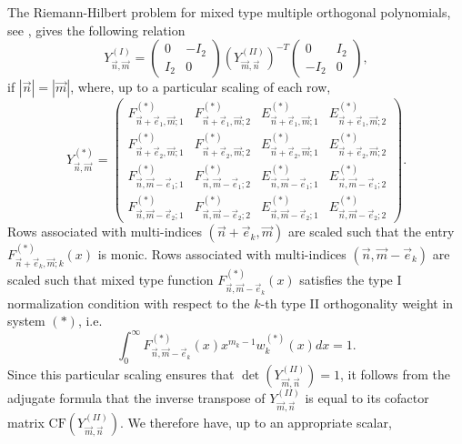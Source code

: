 \documentclass[a4paper,12pt,oneside]{article}
\theoremstyle{definition}
\begin{document}
The Riemann-Hilbert problem for mixed type multiple orthogonal polynomials, see \cite[Lemma 3.3]{DaemsKuijl}, gives the following relation
    $$Y_{\vec{n},\vec{m}}^{(I)} = \begin{pmatrix}
        0 & -I_2 \\
        I_2 & 0
    \end{pmatrix}
    (Y_{\vec{m},\vec{n}}^{(II)})^{-T}
    \begin{pmatrix}
        0 & I_2 \\
        -I_2 & 0
    \end{pmatrix},
    $$
if $|\vec{n}|=|\vec{m}|$, where, up to a particular scaling of each row,
    $$ Y_{\vec{n},\vec{m}}^{(\ast)} = \begin{pmatrix} 
    F_{\vec{n}+\vec{e}_1,\vec{m};1}^{(\ast)} & F_{\vec{n}+\vec{e}_1,\vec{m};2}^{(\ast)} & E_{\vec{n}+\vec{e}_1,\vec{m};1}^{(\ast)} & E_{\vec{n}+\vec{e}_1,\vec{m};2}^{(\ast)} \\ 
    F_{\vec{n}+\vec{e}_2,\vec{m};1}^{(\ast)} & F_{\vec{n}+\vec{e}_2,\vec{m};2}^{(\ast)} & E_{\vec{n}+\vec{e}_2,\vec{m};1}^{(\ast)} & E_{\vec{n}+\vec{e}_2,\vec{m};2}^{(\ast)} \\ 
    F_{\vec{n},\vec{m}-\vec{e}_1;1}^{(\ast)} & F_{\vec{n},\vec{m}-\vec{e}_1;2}^{(\ast)} & E_{\vec{n},\vec{m}-\vec{e}_1;1}^{(\ast)} & E_{\vec{n},\vec{m}-\vec{e}_1;2}^{(\ast)} \\ 
    F_{\vec{n},\vec{m}-\vec{e}_2;1}^{(\ast)} & F_{\vec{n},\vec{m}-\vec{e}_2;2}^{(\ast)} & E_{\vec{n},\vec{m}-\vec{e}_2;1}^{(\ast)} & E_{\vec{n},\vec{m}-\vec{e}_2;2}^{(\ast)} \end{pmatrix}. $$
Rows associated with multi-indices $(\vec{n}+\vec{e}_k,\vec{m})$ are scaled such that the entry $F_{\vec{n}+\vec{e}_k,\vec{m};k}^{(\ast)}(x)$ is monic. Rows associated with multi-indices $(\vec{n},\vec{m}-\vec{e}_k)$ are scaled such that mixed type function $F_{\vec{n},\vec{m}-\vec{e}_k}^{(\ast)}(x)$ satisfies the type I normalization condition with respect to the $k$-th type II orthogonality weight in system $(\ast)$, i.e.
$$ \int_0^\infty F_{\vec{n},\vec{m}-\vec{e}_k}^{(\ast)}(x) x^{m_k-1} w_k^{(\ast)}(x) dx = 1. $$
Since this particular scaling ensures that $\det(Y_{\vec{m},\vec{n}}^{(II)})=1$, it follows from the adjugate formula that the inverse transpose of $Y_{\vec{m},\vec{n}}^{(II)}$ is equal to its cofactor matrix $\text{CF}(Y_{\vec{m},\vec{n}}^{(II)})$. We therefore have, up to an appropriate scalar,
\end{document}
